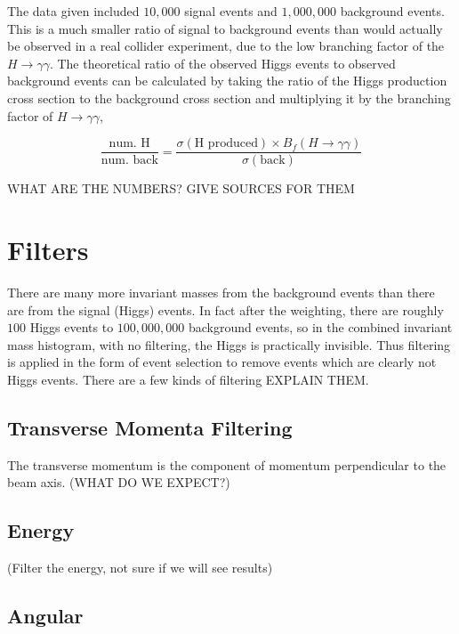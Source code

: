 \documentclass[11pt]{amsart}
\begin{document}
\begin{multicols}{2}
The data given included $10,000$ signal events and $1,000,000$ background events. This is a much smaller ratio of signal to background events than would actually be observed in a real collider experiment, due to the low branching factor of the $H \to \gamma\gamma$. The theoretical ratio of the observed Higgs events to observed background events can be calculated by taking the ratio of the Higgs production cross section to the background cross section and multiplying it by the branching factor of $H \to \gamma\gamma$,

\begin{equation}
  \label{eq:weighting}
  \frac{\text{num. H}}{\text{num. back}} = \frac{\sigma{\left(\text{H produced}\right)} \times B_f\left(H\to\gamma\gamma\right)}{\sigma{\left(\text{back}\right)}}
\end{equation}

WHAT ARE THE NUMBERS? GIVE SOURCES FOR THEM


\section{Filters}

There are many more invariant masses from the background events than there are from the signal (Higgs) events. In fact after the weighting, there are roughly $100$ Higgs events to $100,000,000$ background events, so in the combined invariant mass histogram, with no filtering, the Higgs is practically invisible. Thus filtering is applied in the form of event selection to remove events which are clearly not Higgs events. There are a few kinds of filtering EXPLAIN THEM.

\subsection{Transverse Momenta Filtering}

The transverse momentum is the component of momentum perpendicular to the beam axis. (WHAT DO WE EXPECT?)

\subsection{Energy}

(Filter the energy, not sure if we will see results)

\subsection{Angular}


\end{multicols}
\end{document}
